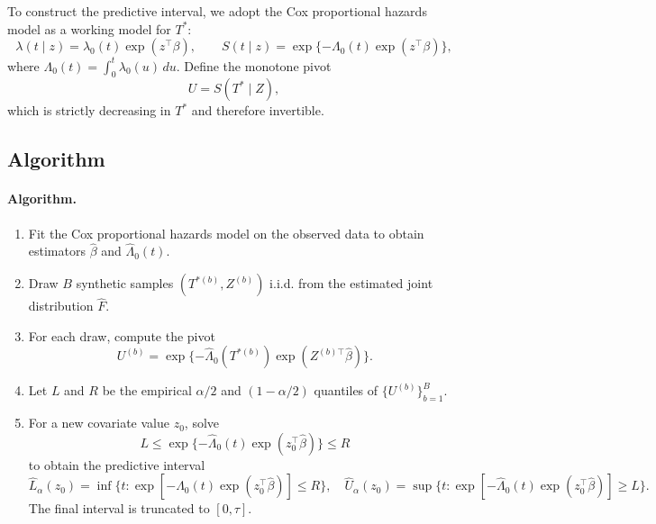 \documentclass[11pt]{article}
\begin{document}
To construct the predictive interval, we adopt the Cox proportional hazards model
as a working model for $T^*$:
\[
\lambda(t \mid z) = \lambda_0(t)\exp(z^\top\beta), \qquad
S(t \mid z) = \exp\{-\Lambda_0(t)\exp(z^\top\beta)\},
\]
where $\Lambda_0(t)=\int_0^t \lambda_0(u)\,du$.
Define the monotone pivot
\[
U = S(T^* \mid Z),
\]
which is strictly decreasing in $T^*$ and therefore invertible.

\subsection{Algorithm}

\paragraph{Algorithm.}
\begin{enumerate}
\item Fit the Cox proportional hazards model on the observed data
to obtain estimators $\widehat\beta$ and $\widehat\Lambda_0(t)$.
\item Draw $B$ synthetic samples $(T^{*(b)}, Z^{(b)})$ i.i.d. from the estimated
joint distribution $\widehat F$.
\item For each draw, compute the pivot
\[
U^{(b)} = \exp\{-\widehat\Lambda_0(T^{*(b)})\exp(Z^{(b)\top}\widehat\beta)\}.
\]
\item Let $L$ and $R$ be the empirical $\alpha/2$ and $(1-\alpha/2)$ quantiles
of $\{U^{(b)}\}_{b=1}^B$.
\item For a new covariate value $z_0$, solve
\[
L \le \exp\{-\widehat\Lambda_0(t)\exp(z_0^\top\widehat\beta)\} \le R
\]
to obtain the predictive interval
\[
\widehat L_\alpha(z_0)
= \inf\{t:\exp[-\widehat\Lambda_0(t)\exp(z_0^\top\widehat\beta)] \le R\}, \quad
\widehat U_\alpha(z_0)
= \sup\{t:\exp[-\widehat\Lambda_0(t)\exp(z_0^\top\widehat\beta)] \ge L\}.
\]
The final interval is truncated to $[0,\tau]$.
\end{enumerate}
\end{document}
